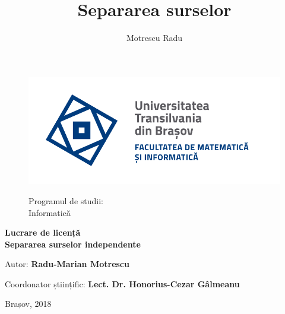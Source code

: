 \documentclass[12pt,oneside]{article}
\title{Separarea surselor}
\author{Motrescu Radu}
\date{}
\begin{document}
\thispagestyle{empty}
\begin{titlepage}
	\begin{center}
\begin{figure}[H]
			\begin{minipage}[l]{70pt}
				\includegraphics[scale=0.4]{sigla}
			\end{minipage}
			\begin{minipage}[c]{300pt}
				\begin{flushright}
					{\large}{Programul de studii:\\	\vspace{0.3em}
							Informatică}
				\end{flushright}
			\end{minipage}
		\end{figure}
        \centering
        \vspace{4\baselineskip}
        {\Huge
        \textbf{Lucrare de licență}\\ \textbf{Separarea surselor independente}\par}
        \vspace{15\baselineskip}
		\par
		\begin{flushleft}
        {\large{Autor: \hspace{33mm}	\textbf{Radu-Marian Motrescu}}\par}
        {\large{Coordonator științific: \hspace{1mm} \textbf{Lect. Dr. Honorius-Cezar Gâlmeanu}}\par}
		\end{flushleft}
		\vfill
		\par
        {\Large{Brașov, 2018}\par}
    \end{center}
\end{titlepage}
\end{document}
